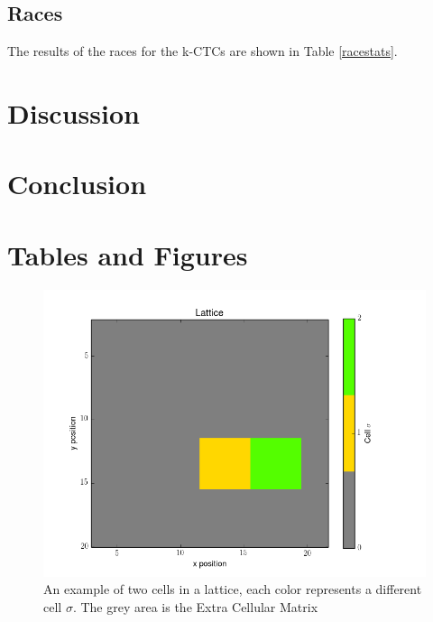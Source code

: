 \documentclass[12pt]{article}
\begin{document}
\subsection{Races}
The results of the races for the k-CTCs are shown in Table \ref{racestats}. 


\section{Discussion}
\section{Conclusion}

\pagebreak
\section{Tables and Figures}

\begin{figure}[h]
	\centering
	\includegraphics[scale=0.5]{img/basic}
	\caption{An example of two cells in a lattice, each color represents a different cell $\sigma$. The grey area is the Extra Cellular Matrix}
	\label{basic}
\end{figure}
\end{document}
